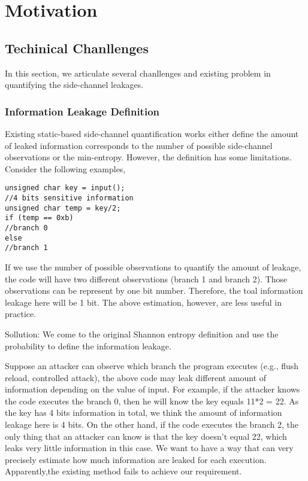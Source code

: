 \section{Motivation}
\subsection{Techinical Chanllenges}
In this section, we articulate several chanllenges and existing problem
in quantifying the side-channel leakages. 

\subsubsection{Information Leakage Definition}
Existing static-based side-channel quantification works either define the amount of leaked information 
corresponds to the number of possible side-channel observations or the min-entropy. 
However, the definition has some limitations. Consider the following examples,
\begin{lstlisting}
unsigned char key = input(); 
//4 bits sensitive information 
unsigned char temp = key/2;
if (temp == 0xb)
//branch 0
else
//branch 1
\end{lstlisting}

If we use the number of possible observations to quantify the amount of leakage, 
the code will have two different observations (branch 1 and branch 2). Those observations
can be represent by one bit number. Therefore, the toal information leakage here will be 1 bit. 
The above estimation, however, are less useful in practice.

Sollution: We come to the original Shannon entropy definition and use the probability to
define the information leakage.


Suppose an attacker can observe which branch the program executes (e.g., flush reload, controlled attack), 
the above code may leak different amount of information depending on the value of input.
For example, if the attacker knows the code executes the branch 0, 
then he will know the key equals 11*2 = 22. 
As the key has 4 bits information in total, we think the amount of information leakage here is 4 bits. 
On the other hand, if the code executes the branch 2, 
the only thing that an attacker can know is that the key doesn’t equal 22, 
which leaks very little information in this case.  
We want to have a way that can very precisely estimate how much information
are leaked for each execution. Apparently,the existing method fails to achieve
our requirement.

